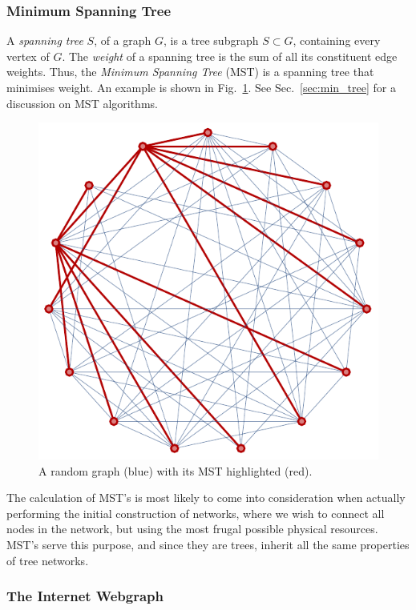 \documentclass[aps,rmp,twocolumn,amsmath,amssymb,nofootinbib,superscriptaddress]{revtex4}
\begin{document}
%
%

\subsubsection{Minimum Spanning Tree} \label{sec:graph_MST}

A \emph{spanning tree} $S$, of a graph $G$, is a tree subgraph \mbox{$S\subset G$}, containing every vertex of $G$. The \emph{weight} of a spanning tree is the sum of all its constituent edge weights. Thus, the \emph{Minimum Spanning Tree} (MST) is a spanning tree that minimises weight. An example is shown in Fig.~\ref{fig:mst}. See Sec.~\ref{sec:min_tree} for a discussion on MST algorithms.

\begin{figure}[!htb]
\includegraphics[width=0.8\columnwidth]{mst}
\caption{A random graph (blue) with its MST highlighted (red).} \label{fig:mst}
\end{figure}

The calculation of MST's is most likely to come into consideration when actually performing the initial construction of networks, where we wish to connect all nodes in the network, but using the most frugal possible physical resources. MST's serve this purpose, and since they are trees, inherit all the same properties of tree networks.

%
%

\subsubsection{The Internet Webgraph}
\end{document}
